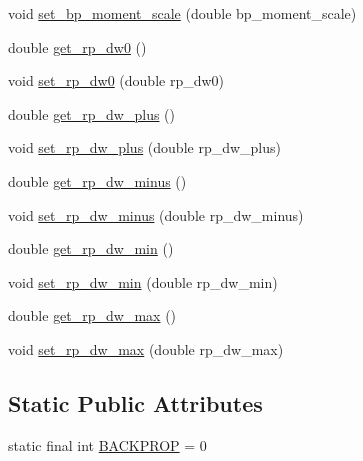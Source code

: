 \begin{DoxyCompactItemize}
\item 
void \mbox{\hyperlink{classorg_1_1opencv_1_1ml_1_1_cv_a_n_n___m_l_p___train_params_a2f9bbd88b4eb04200c69ec452694c24c}{set\+\_\+bp\+\_\+moment\+\_\+scale}} (double bp\+\_\+moment\+\_\+scale)
\item 
double \mbox{\hyperlink{classorg_1_1opencv_1_1ml_1_1_cv_a_n_n___m_l_p___train_params_a92830d85b2b60ace38ed3020e5995101}{get\+\_\+rp\+\_\+dw0}} ()
\item 
void \mbox{\hyperlink{classorg_1_1opencv_1_1ml_1_1_cv_a_n_n___m_l_p___train_params_a2c1ccc1a89deb831df846beb9923d29c}{set\+\_\+rp\+\_\+dw0}} (double rp\+\_\+dw0)
\item 
double \mbox{\hyperlink{classorg_1_1opencv_1_1ml_1_1_cv_a_n_n___m_l_p___train_params_a9b07478ce25547f2ba7717610179a950}{get\+\_\+rp\+\_\+dw\+\_\+plus}} ()
\item 
void \mbox{\hyperlink{classorg_1_1opencv_1_1ml_1_1_cv_a_n_n___m_l_p___train_params_a0a43af46f22bcf1c5d3b2c68fe75a2d7}{set\+\_\+rp\+\_\+dw\+\_\+plus}} (double rp\+\_\+dw\+\_\+plus)
\item 
double \mbox{\hyperlink{classorg_1_1opencv_1_1ml_1_1_cv_a_n_n___m_l_p___train_params_acefdb8ace543f2a5f600b1bd17745c7e}{get\+\_\+rp\+\_\+dw\+\_\+minus}} ()
\item 
void \mbox{\hyperlink{classorg_1_1opencv_1_1ml_1_1_cv_a_n_n___m_l_p___train_params_ae9fbfc9c62ccfedeeb6af1b660418fd7}{set\+\_\+rp\+\_\+dw\+\_\+minus}} (double rp\+\_\+dw\+\_\+minus)
\item 
double \mbox{\hyperlink{classorg_1_1opencv_1_1ml_1_1_cv_a_n_n___m_l_p___train_params_a8d7ca7cdf8de28a2c44cb03c32574373}{get\+\_\+rp\+\_\+dw\+\_\+min}} ()
\item 
void \mbox{\hyperlink{classorg_1_1opencv_1_1ml_1_1_cv_a_n_n___m_l_p___train_params_af0ebb26a7ae63cc1bd52adf1e7b7b094}{set\+\_\+rp\+\_\+dw\+\_\+min}} (double rp\+\_\+dw\+\_\+min)
\item 
double \mbox{\hyperlink{classorg_1_1opencv_1_1ml_1_1_cv_a_n_n___m_l_p___train_params_a9ad3e393816818cf6325249f32a6eec6}{get\+\_\+rp\+\_\+dw\+\_\+max}} ()
\item 
void \mbox{\hyperlink{classorg_1_1opencv_1_1ml_1_1_cv_a_n_n___m_l_p___train_params_a6f320ecffad4aaaa8760d9ea4e49fde3}{set\+\_\+rp\+\_\+dw\+\_\+max}} (double rp\+\_\+dw\+\_\+max)
\end{DoxyCompactItemize}
\subsection*{Static Public Attributes}
\begin{DoxyCompactItemize}
\item 
static final int \mbox{\hyperlink{classorg_1_1opencv_1_1ml_1_1_cv_a_n_n___m_l_p___train_params_ae02beed0a9cec6fab969762b5c42bbc6}{B\+A\+C\+K\+P\+R\+OP}} = 0
\end{DoxyCompactItemize}
